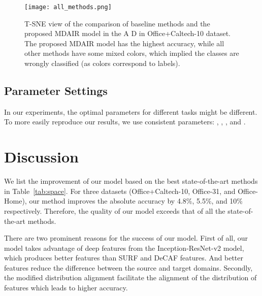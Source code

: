 \documentclass[10pt, conference, compsocconf]{IEEEtran}
\begin{document}
\begin{figure}[t]
\centering
\texttt{[image: all\_methods.png]}
\caption{T-SNE view of the comparison of baseline methods and the proposed MDAIR model in the A  D in Office+Caltech-10 dataset. The proposed MDAIR model has the highest accuracy, while all other methods have some mixed colors, which implied the classes are wrongly classified (as colors correspond to labels).}
\label{fig:all_methods}
\end{figure}

\subsection{Parameter Settings }
In our experiments, the optimal parameters for different tasks might be different. To more easily reproduce our results, we use consistent parameters: , , , and .

\section{Discussion}

\begin{table}[h]
\begin{center}
\caption{Comparison of average accuracy of the best baseline method and our MDAIR model}
\end{center}
\end{table}

We list the improvement of our model based on the best state-of-the-art methods in Table~\ref{tab:space}. For three datasets (Office+Caltech-10, Office-31, and Office-Home), our method improves the absolute accuracy by 4.8\%, 5.5\%, and 10\% respectively. Therefore, the quality of our model exceeds that of all the state-of-the-art methods.

There are two prominent reasons for the success of our model. First of all, our model takes advantage of deep features from the Inception-ResNet-v2 model, which produces  better features than SURF and DeCAF features. And better features reduce the difference between the source and target domains. Secondly, the modified distribution alignment facilitate the alignment of the distribution of features which leads to higher accuracy. 
\end{document}
